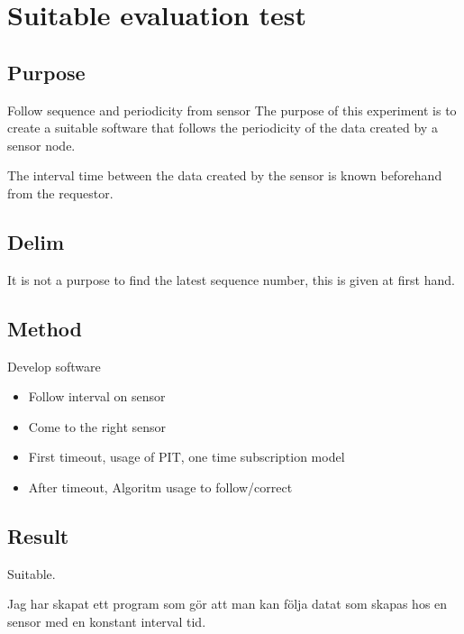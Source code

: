 \section{Suitable evaluation test}
\subsection{Purpose}
Follow sequence and periodicity from sensor
The purpose of this experiment is to create a suitable software that follows the periodicity of the data created by a sensor node.

The interval time between the data created by the sensor is known beforehand from the requestor.

\subsection{Delim}
It is not a purpose to find the latest sequence number, this is given at first hand.


\subsection{Method}
Develop software

\begin{itemize}
\item Follow interval on sensor
\item Come to the right sensor
\item First timeout, usage of PIT, one time subscription model
\item After timeout, Algoritm usage to follow/correct

\end{itemize}




\subsection{Result}
Suitable.




Jag har skapat ett program som gör att man kan följa datat som skapas hos en sensor med en konstant interval tid. 